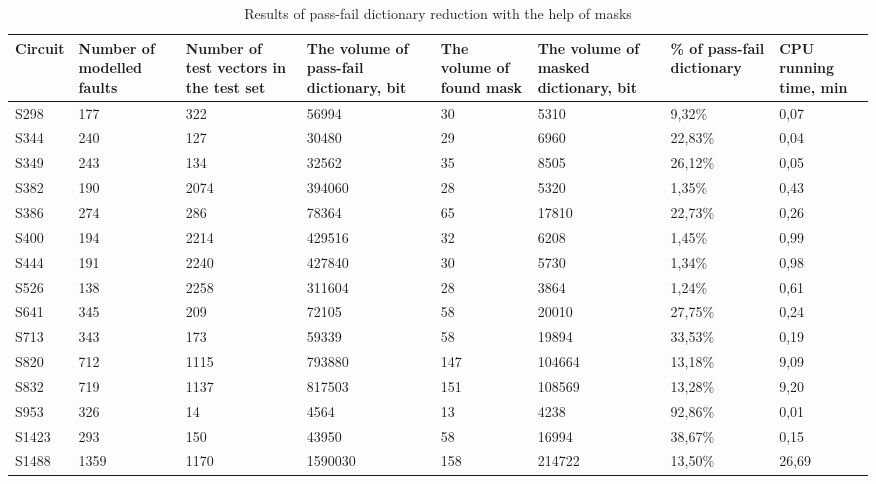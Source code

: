 \documentclass[bachelor, och, coursework]{SCWorks}
\begin{document}
\begin{table}[!ht]
	\footnotesize
	\caption{Results of pass-fail dictionary reduction with the help
	of masks} \label{table-2}
	\begin{tabular}{|p{1.5cm}|
	                 p{1.5cm}|
	                 p{1.5cm}|
	                 p{1.5cm}|
	                 p{1cm}|
	                 p{1.5cm}|
	                 p{1.5cm}|
	                 p{1cm}|}
		\hline \centering Circuit & Number of modelled faults & Number of test
		vectors in the test set & The volume of pass-fail dictionary,
		\linebreak bit & The volume of found mask & The volume of
		masked dictionary, \linebreak bit & \raggedright \% of pass-fail dictionary
		& CPU running time, \linebreak min
		\\
		\hline S298 & 177 & 322 & 56994 & 30 & 5310 & 9,32\% & 0,07\\
		\hline S344 & 240 & 127 & 30480 & 29 & 6960 & 22,83\% & 0,04\\
		\hline S349 & 243 & 134 & 32562 & 35 & 8505 & 26,12\% & 0,05\\
		\hline S382 & 190 & 2074 & 394060 & 28 & 5320 & 1,35\% & 0,43\\
		\hline S386 & 274 & 286 & 78364 & 65 & 17810 & 22,73\% & 0,26\\
		\hline S400 & 194 & 2214 & 429516 & 32 & 6208 & 1,45\% & 0,99\\
		\hline S444 & 191 & 2240 & 427840 & 30 & 5730 & 1,34\% & 0,98\\
		\hline S526 & 138 & 2258 & 311604 & 28 & 3864 & 1,24\% & 0,61\\
		\hline S641 & 345 & 209 & 72105 & 58 & 20010 & 27,75\% & 0,24\\
		\hline S713 & 343 & 173 & 59339 & 58 & 19894 & 33,53\% & 0,19\\
		\hline S820 & 712 & 1115 & 793880 & 147 & 104664 & 13,18\% & 9,09\\
		\hline S832 & 719 & 1137 & 817503 & 151 & 108569 & 13,28\% & 9,20\\
		\hline S953 & 326 & 14 & 4564 & 13 & 4238 & 92,86\% & 0,01\\
		\hline S1423 & 293 & 150 & 43950 & 58 & 16994 & 38,67\% & 0,15\\
		\hline S1488 & 1359 & 1170 & 1590030 & 158 & 214722 & 13,50\% & 26,69\\
		\hline
	\end{tabular}
\end{table}
\end{document}
